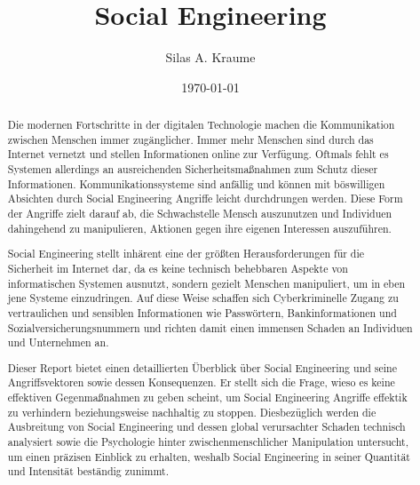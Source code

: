 \documentclass{report}
\begin{document}
\title{\Huge{Social Engineering}}
\author{Silas A. Kraume}
\date{\today}

\maketitle

\tableofcontents

\begin{abstract}
    Die modernen Fortschritte in der digitalen Technologie machen die Kommunikation zwischen Menschen immer zugänglicher.
    Immer mehr Menschen sind durch das Internet vernetzt und stellen Informationen online zur Verfügung.
    Oftmals fehlt es Systemen allerdings an ausreichenden Sicherheitsmaßnahmen zum Schutz dieser Informationen.
    Kommunikationssysteme sind anfällig und können mit böswilligen Absichten durch Social Engineering Angriffe leicht durchdrungen werden.
    Diese Form der Angriffe zielt darauf ab, die Schwachstelle Mensch auszunutzen und Individuen dahingehend zu manipulieren, Aktionen gegen ihre eigenen Interessen auszuführen.

    Social Engineering stellt inhärent eine der größten Herausforderungen für die Sicherheit im Internet dar,
    da es keine technisch behebbaren Aspekte von informatischen Systemen ausnutzt, sondern gezielt Menschen manipuliert, um in eben jene Systeme einzudringen.
    Auf diese Weise schaffen sich Cyberkriminelle Zugang zu vertraulichen und sensiblen Informationen wie Passwörtern, Bankinformationen und Sozialversicherungsnummern
    und richten damit einen immensen Schaden an Individuen und Unternehmen an.

    Dieser Report bietet einen detaillierten Überblick über Social Engineering und seine Angriffsvektoren sowie dessen Konsequenzen.
    Er stellt sich die Frage, wieso es keine effektiven Gegenmaßnahmen zu geben scheint, um Social Engineering Angriffe effektik zu verhindern
    beziehungsweise nachhaltig zu stoppen.
    Diesbezüglich werden die Ausbreitung von Social Engineering und dessen global verursachter Schaden technisch analysiert sowie die Psychologie hinter zwischenmenschlicher Manipulation untersucht,
    um einen präzisen Einblick zu erhalten, weshalb Social Engineering in seiner Quantität und Intensität beständig zunimmt.
\end{abstract}








{}


\end{document}
